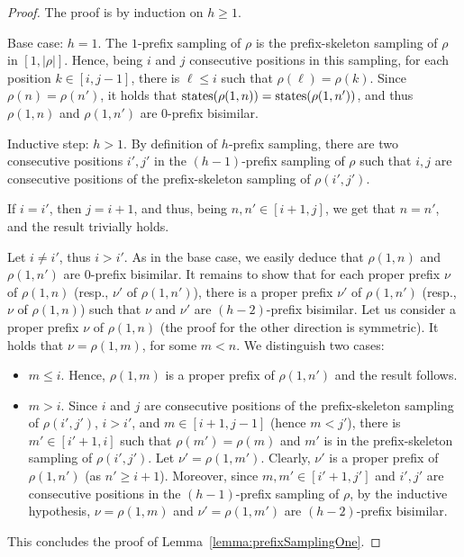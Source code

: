 \begin{proof} The proof is by induction on $h\geq 1$.

Base case: $h=1$. The $1$-prefix sampling of $\rho$ is the prefix-skeleton sampling of $\rho$ in $[1,|\rho|]$. Hence, being $i$ and $j$ consecutive positions in this sampling, for each position $k\in [i,j-1]$, there is $\ell\leq i$ such that $\rho(\ell)=\rho(k)$. Since $\rho(n)=\rho(n')$, it holds that $\operatorname{states}(\rho(1,n))=\operatorname{states}(\rho(1,n'))$, and thus $\rho(1,n)$ and $\rho(1,n')$ are $0$-prefix bisimilar.

Inductive step: $h>1$. By definition of $h$-prefix sampling, there are two consecutive positions $i',j'$ in the $(h-1)$-prefix
  sampling of $\rho$ such that    $i,j$ are consecutive positions of the prefix-skeleton sampling of $\rho(i',j')$.

  If $i=i'$, then $j=i+1$, and thus, being $n,n'\in [i+1,j]$, we get that $n=n'$, and the result trivially holds.

  Let $i\neq i'$, thus $i>i'$.
     As in the base case, we easily deduce that $\rho(1,n)$ and $\rho(1,n')$ are $0$-prefix bisimilar. It remains to show that
for each proper prefix $\nu$ of $\rho(1,n)$ (resp., $\nu'$ of $\rho(1,n')$), there is a proper prefix $\nu'$ of $\rho(1,n')$ (resp., $\nu$ of $\rho(1,n)$) such that $\nu$ and $\nu'$ are $(h-2)$-prefix bisimilar. Let us consider a proper prefix $\nu$ of $\rho(1,n)$ (the proof for the other direction is symmetric). It holds that $\nu = \rho(1,m)$, for some $m<n$. We distinguish two cases:
\begin{itemize}
  \item $m\leq i$. Hence, $\rho(1,m)$ is a proper prefix of $\rho(1,n')$ and the result follows.
  \item $m>i$. Since $i$ and $j$ are consecutive positions of the prefix-skeleton sampling of $\rho(i',j')$, $i>i'$,
   and $m\in [i+1,j-1]$ (hence $m<j'$), there is $m'\in [i'+1,i]$ such that $\rho(m')=\rho(m)$ and $m'$ is in the prefix-skeleton sampling of $\rho(i',j')$. Let $\nu'=\rho(1,m')$. Clearly, $\nu'$ is a proper prefix of $\rho(1,n')$ (as $n'\geq i+1$). Moreover, since
       $m,m'\in [i'+1,j']$ and $i',j'$ are consecutive positions in the $(h-1)$-prefix sampling of $\rho$, by the inductive   hypothesis, $\nu=\rho(1,m)$ and $\nu'=\rho(1,m')$ are $(h-2)$-prefix bisimilar.
 \end{itemize}
%
This concludes the proof of Lemma~\ref{lemma:prefixSamplingOne}.
\end{proof}